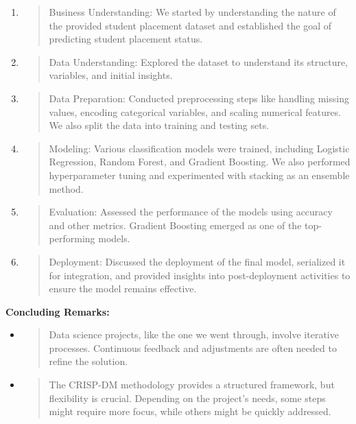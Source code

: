 \documentclass[]{article}
\newcommand{\textcenter}[1]{\begin{center} \vspace{10px}\textbf{\large #1} \end{center}}
\begin{document}
\begin{enumerate}
\def\labelenumi{\arabic{enumi}.}
\item
  \begin{quote}
  Business Understanding: We started by understanding the nature of the
  provided student placement dataset and established the goal of
  predicting student placement status.
  \end{quote}
\item
  \begin{quote}
  Data Understanding: Explored the dataset to understand its structure,
  variables, and initial insights.
  \end{quote}
\item
  \begin{quote}
  Data Preparation: Conducted preprocessing steps like handling missing
  values, encoding categorical variables, and scaling numerical
  features. We also split the data into training and testing sets.
  \end{quote}
\item
  \begin{quote}
  Modeling: Various classification models were trained, including
  Logistic Regression, Random Forest, and Gradient Boosting. We also
  performed hyperparameter tuning and experimented with stacking as an
  ensemble method.
  \end{quote}
\item
  \begin{quote}
  Evaluation: Assessed the performance of the models using accuracy and
  other metrics. Gradient Boosting emerged as one of the top-performing
  models.
  \end{quote}
\item
  \begin{quote}
  Deployment: Discussed the deployment of the final model, serialized it
  for integration, and provided insights into post-deployment activities
  to ensure the model remains effective.
  \end{quote}
\end{enumerate}

\textcenter{Concluding Remarks:}

\begin{itemize}
\item
  \begin{quote}
  Data science projects, like the one we went through, involve iterative
  processes. Continuous feedback and adjustments are often needed to
  refine the solution.
  \end{quote}
\item
  \begin{quote}
  The CRISP-DM methodology provides a structured framework, but
  flexibility is crucial. Depending on the project's needs, some steps
  might require more focus, while others might be quickly addressed.
  \end{quote}
\end{itemize}
\end{document}
